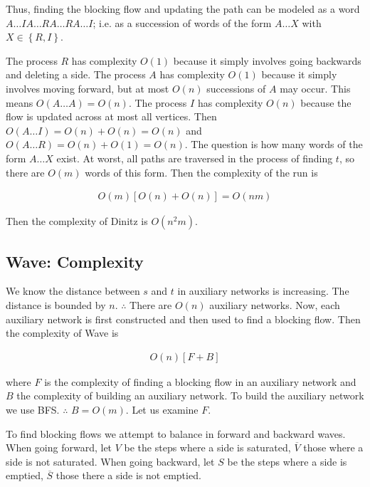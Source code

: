 Thus, finding the blocking flow and updating the path can be modeled 
as a word $A \ldots I A \ldots R A \ldots R A\ldots I$; i.e. as a succession 
of words of the form $A \ldots X$ with $X \in \left\{ R, I \right\} $.

The process $R$ has complexity $O(1)$ because it simply involves going
backwards and deleting a side. The process $A$ has complexity $O(1)$ because it
simply involves moving forward, but at most $O(n)$ successions of $A$ may 
occur. This means $O(A \ldots A) = O(n)$. The process $I$ has complexity $O(n)$
because the flow is updated across at most all vertices. Then  
$O(A\ldots I) = O(n) + O(n) = O(n)$ and $O(A\ldots R) = O(n) + O(1) = O(n)$.
The question is how many words of the form $A \ldots X$ exist. At worst, all
paths are traversed in the process of finding $t$, so there are $O(m)$ words of
this form. Then the complexity of the run is 

\begin{align*}
    O(m) \left[ O(n) + O(n) \right]  = O(nm)
\end{align*}

Then the complexity of Dinitz is $O(n^2m)$.

\pagebreak

\subsection{Wave: Complexity}

We know the distance between $s$ and $t$ in auxiliary networks is increasing.
The distance is bounded by $n$. $\therefore $ There are $O(n)$ auxiliary
networks. Now, each auxiliary network is first constructed and then 
used to find a blocking flow. Then the complexity of Wave is 

\begin{align*}
    O(n) \left[ F + B \right] 
\end{align*}

where $F$ is the complexity of finding a blocking flow in an auxiliary network 
and $B$ the complexity of building an auxiliary network. To build the auxiliary 
network we use BFS. $\therefore  $ $B = O(m)$. Let us examine $F$.

To find blocking flows we attempt to balance in forward and backward waves.
When going forward, let $V$ be the steps where a side is saturated,
$\overline{V}$ those where a side is not saturated. When going 
backward, let $S$ be the steps where a side is emptied, $\overline{S}$ those 
there a side is not emptied. 

